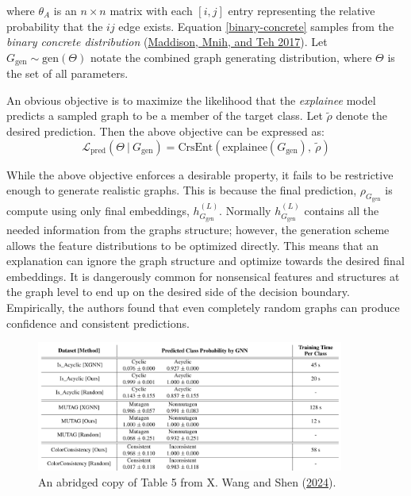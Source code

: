 \documentclass[
  11pt,
  letterpaper,
]{article}
\begin{document}
where \(\theta_A\) is an \(n \times n\) matrix with each \([i, j]\)
entry representing the relative probability that the \(ij\) edge exists.
Equation \ref{binary-concrete} samples from the \emph{binary concrete
distribution} (\protect\hyperlink{ref-Maddison_Mnih_Teh_2017}{Maddison,
Mnih, and Teh 2017}). Let \(G_{\text{gen}} \sim \text{gen}(\Theta)\)
notate the combined graph generating distribution, where \(\Theta\) is
the set of all parameters.

\quad An obvious objective is to maximize the likelihood that the
\emph{explainee} model predicts a sampled graph to be a member of the
target class. Let \(\tilde{\rho}\) denote the desired prediction. Then
the above objective can be expressed as: \begin{equation} \label{l-pred}
    \mathcal{L}_\text{pred} (\Theta \ | \ G_\text{gen}) = \text{CrsEnt} (\text{explainee}(G_\text{gen}), \ \tilde{\rho})
\end{equation}

While the above objective enforces a desirable property, it fails to be
restrictive enough to generate realistic graphs. This is because the
final prediction, \(\rho_{G_{\text{gen}}}\) is compute using only final
embeddings, \(h^{(L)}_{G_{\text{gen}}}\). Normally
\(h^{(L)}_{G_{\text{gen}}}\) contains all the needed information from
the graphs structure; however, the generation scheme allows the feature
distributions to be optimized directly. This means that an explanation
can ignore the graph structure and optimize towards the desired final
embeddings. It is dangerously common for nonsensical features and
structures at the graph level to end up on the desired side of the
decision boundary. Empirically, the authors found that even completely
random graphs can produce confidence and consistent predictions.

\begin{figure}

{\centering \includegraphics[width=0.9\textwidth,height=\textheight]{figures/random_baseline.png}

}

\caption{\label{fig-random-baseline}An abridged copy of Table 5 from X.
Wang and Shen (\protect\hyperlink{ref-Wang_Shen_2024}{2024}).}

\end{figure}
\end{document}
